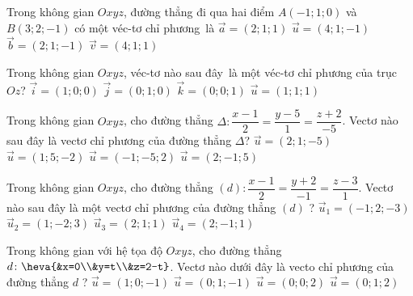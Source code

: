 \begin{ex}%
	Trong không gian $Oxyz$, đường thẳng đi qua hai điểm  $A(-1;1;0)$ và $B(3;2;-1)$ có một véc-tơ chỉ phương~là
	\choice 
		{$\overrightarrow{a}=(2;1;1)$} 
		{\True  $\overrightarrow{u}=(4;1;-1)$}
		{$\overrightarrow{b}=(2;1;-1)$} 
		 {$\overrightarrow{v}=(4;1;1)$}
\end{ex}

\begin{ex}%
	Trong không gian $ Oxyz$, véc-tơ nào sau đây~là một véc-tơ  chỉ phương của trục $Oz$?
	 \choice
		 {${\overrightarrow{i}}=\left(1;0;0\right)$}
		{${\overrightarrow{j}}=\left(0;1;0\right)$}
		{\True $\overrightarrow{k}=\left(0;0;1\right)$} 
		 {${\overrightarrow{u}}=\left(1;1;1\right)$}
\end{ex}

\begin{ex}%
	Trong không gian  $Oxyz$, cho đường thẳng $\Delta:\dfrac{x-1}{2}=\dfrac{y-5}{1}=\dfrac{z+2}{-5}$. Vectơ nào sau đây là vectơ chỉ phương của đường thẳng $\Delta$?
	 \choice
		{\True  $\overrightarrow{u}=(2;1;-5)$}
		 {$\overrightarrow{u}=(1;5;-2)$}
		 {$\overrightarrow{u}=(-1;-5;2)$}
		 {$\overrightarrow{u}=(2;-1;5)$}
\end{ex}

\begin{ex}%
	Trong không gian $Oxyz$, cho đường thẳng $(d)\colon\dfrac{x-1}{2}=\dfrac{y+2}{-1}=\dfrac{z-3}{1}$. Vectơ nào sau  đây là một vectơ chỉ phương của đường thẳng $(d)$ ?
	\choice 
		 {$\overrightarrow{u}_1=(-1;2;-3)$}
		 {$\overrightarrow{u}_2=(1;-2;3)$}
		 {$\overrightarrow{u}_3=(2;1;1)$}
		{\True  $\overrightarrow{u}_4=(2;-1;1)$}
\end{ex}

\begin{ex}%
	Trong không gian với hệ tọa độ $Oxyz$, cho đường thẳng $d\colon \heva{&x=0\\&y=t\\&z=2-t}$. Vectơ nào dưới đây là vecto  chỉ phương của đường thẳng $d$ ?
	 \choice
		{\True $\overrightarrow{u}=(1; 0;-1)$} 
		{$\overrightarrow{u}=(0;  1;-1)$}
		{$\overrightarrow{u}=(0; 0; 2)$} 
		{$\overrightarrow{u}=(0; 1;  2)$}
\end{ex}

